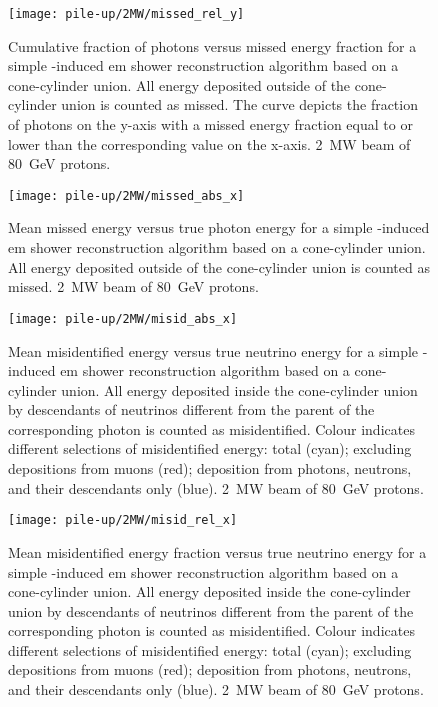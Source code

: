 \begin{figure}[htb]
	\centering
	\texttt{[image: pile-up/2MW/missed\_rel\_y]}
	\caption[Pile-up study photon vs.\ missed energy fraction, \SI{2}{\mega\watt} beam]{%
		Cumulative fraction of photons versus missed energy fraction for a simple \Pgpz-induced \acrshort{em} shower reconstruction algorithm based on a cone-cylinder union.
		All energy deposited outside of the cone-cylinder union is counted as missed.
		The curve depicts the fraction of photons on the y-axis with a missed energy fraction equal to or lower than the corresponding value on the x-axis.
		\SI{2}{\mega\watt} beam of \SI{80}{\giga\electronvolt} protons.
	}
	\label{fig:dune-nd_2MW_missed-rel-y}
\end{figure}

\begin{figure}[htb]
	\centering
	\texttt{[image: pile-up/2MW/missed\_abs\_x]}
	\caption[Pile-up study mean missed vs.\ true photon energy, \SI{2}{\mega\watt} beam]{%
		Mean missed energy versus true photon energy for a simple \Pgpz-induced \acrshort{em} shower reconstruction algorithm based on a cone-cylinder union.
		All energy deposited outside of the cone-cylinder union is counted as missed.
		\SI{2}{\mega\watt} beam of \SI{80}{\giga\electronvolt} protons.
	}
	\label{fig:dune-nd_2MW_missed-abs-x}
\end{figure}

\begin{figure}[htb]
	\centering
	\texttt{[image: pile-up/2MW/misid\_abs\_x]}
	\caption[Pile-up study mean misidentified vs.\ true neutrino energy, \SI{2}{\mega\watt} beam]{%
		Mean misidentified energy versus true neutrino energy for a simple \Pgpz-induced \acrshort{em} shower reconstruction algorithm based on a cone-cylinder union.
		All energy deposited inside the cone-cylinder union by descendants of neutrinos different from the parent of the corresponding \Pgpz photon is counted as misidentified.
		Colour indicates different selections of misidentified energy: total (cyan); excluding depositions from muons (red); deposition from photons, neutrons, and their descendants only (blue).
		\SI{2}{\mega\watt} beam of \SI{80}{\giga\electronvolt} protons.
	}
	\label{fig:dune-nd_2MW_misid-abs-x}
\end{figure}

\begin{figure}[htb]
	\centering
	\texttt{[image: pile-up/2MW/misid\_rel\_x]}
	\caption[Pile-up study mean misidentified fractional vs.\ true neutrino energy, \SI{2}{\mega\watt} beam]{%
		Mean misidentified energy fraction versus true neutrino energy for a simple \Pgpz-induced \acrshort{em} shower reconstruction algorithm based on a cone-cylinder union.
		All energy deposited inside the cone-cylinder union by descendants of neutrinos different from the parent of the corresponding \Pgpz photon is counted as misidentified.
		Colour indicates different selections of misidentified energy: total (cyan); excluding depositions from muons (red); deposition from photons, neutrons, and their descendants only (blue).
		\SI{2}{\mega\watt} beam of \SI{80}{\giga\electronvolt} protons.
	}
	\label{fig:dune-nd_2MW_misid-rel-x}
\end{figure}

